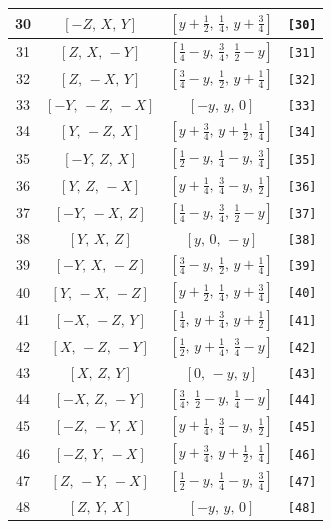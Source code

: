 \documentclass[fleqn,8pt]{jsarticle}
\begin{document}
\begin{longtable}{cccc}
30 & $\left[ - Z,\, X,\, Y \right]$ & $\left[ y + \frac{1}{2},\, \frac{1}{4},\, y + \frac{3}{4} \right]$ & {\tt [30]} \\ \hline
31 & $\left[ Z,\, X,\, - Y \right]$ & $\left[ \frac{1}{4} - y,\, \frac{3}{4},\, \frac{1}{2} - y \right]$ & {\tt [31]} \\ \hline
32 & $\left[ Z,\, - X,\, Y \right]$ & $\left[ \frac{3}{4} - y,\, \frac{1}{2},\, y + \frac{1}{4} \right]$ & {\tt [32]} \\ \hline
33 & $\left[ - Y,\, - Z,\, - X \right]$ & $\left[ - y,\, y,\, 0 \right]$ & {\tt [33]} \\ \hline
34 & $\left[ Y,\, - Z,\, X \right]$ & $\left[ y + \frac{3}{4},\, y + \frac{1}{2},\, \frac{1}{4} \right]$ & {\tt [34]} \\ \hline
35 & $\left[ - Y,\, Z,\, X \right]$ & $\left[ \frac{1}{2} - y,\, \frac{1}{4} - y,\, \frac{3}{4} \right]$ & {\tt [35]} \\ \hline
36 & $\left[ Y,\, Z,\, - X \right]$ & $\left[ y + \frac{1}{4},\, \frac{3}{4} - y,\, \frac{1}{2} \right]$ & {\tt [36]} \\ \hline
37 & $\left[ - Y,\, - X,\, Z \right]$ & $\left[ \frac{1}{4} - y,\, \frac{3}{4},\, \frac{1}{2} - y \right]$ & {\tt [37]} \\ \hline
38 & $\left[ Y,\, X,\, Z \right]$ & $\left[ y,\, 0,\, - y \right]$ & {\tt [38]} \\ \hline
39 & $\left[ - Y,\, X,\, - Z \right]$ & $\left[ \frac{3}{4} - y,\, \frac{1}{2},\, y + \frac{1}{4} \right]$ & {\tt [39]} \\ \hline
40 & $\left[ Y,\, - X,\, - Z \right]$ & $\left[ y + \frac{1}{2},\, \frac{1}{4},\, y + \frac{3}{4} \right]$ & {\tt [40]} \\ \hline
41 & $\left[ - X,\, - Z,\, Y \right]$ & $\left[ \frac{1}{4},\, y + \frac{3}{4},\, y + \frac{1}{2} \right]$ & {\tt [41]} \\ \hline
42 & $\left[ X,\, - Z,\, - Y \right]$ & $\left[ \frac{1}{2},\, y + \frac{1}{4},\, \frac{3}{4} - y \right]$ & {\tt [42]} \\ \hline
43 & $\left[ X,\, Z,\, Y \right]$ & $\left[ 0,\, - y,\, y \right]$ & {\tt [43]} \\ \hline
44 & $\left[ - X,\, Z,\, - Y \right]$ & $\left[ \frac{3}{4},\, \frac{1}{2} - y,\, \frac{1}{4} - y \right]$ & {\tt [44]} \\ \hline
45 & $\left[ - Z,\, - Y,\, X \right]$ & $\left[ y + \frac{1}{4},\, \frac{3}{4} - y,\, \frac{1}{2} \right]$ & {\tt [45]} \\ \hline
46 & $\left[ - Z,\, Y,\, - X \right]$ & $\left[ y + \frac{3}{4},\, y + \frac{1}{2},\, \frac{1}{4} \right]$ & {\tt [46]} \\ \hline
47 & $\left[ Z,\, - Y,\, - X \right]$ & $\left[ \frac{1}{2} - y,\, \frac{1}{4} - y,\, \frac{3}{4} \right]$ & {\tt [47]} \\ \hline
48 & $\left[ Z,\, Y,\, X \right]$ & $\left[ - y,\, y,\, 0 \right]$ & {\tt [48]} \\
\end{longtable}
\end{document}

